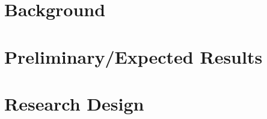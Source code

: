 \documentclass[12pt]{article}
\begin{document}
\section{Background}

\section{Preliminary/Expected Results}

\section{Research Design}
\end{document}
